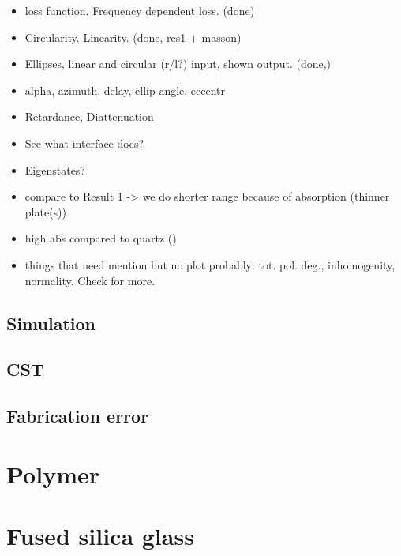 \begin{itemize}
    \item loss function. Frequency dependent loss. (done)
    \item Circularity. Linearity. (done, res1 + masson)
    \item Ellipses, linear and circular (r/l?) input, shown output. (done,)
    \item alpha, azimuth, delay, ellip angle, eccentr
    \item Retardance, Diattenuation
    \item See what interface does?
    \item Eigenstates?
    \item compare to Result 1 -> we do shorter range because of absorption (thinner plate(s))
    \item high abs compared to quartz (\cite{DGrischkowsky1990})
    \item things that need mention but no plot probably: tot. pol. deg., inhomogenity, normality. Check for more.
\end{itemize}

\subsection{Simulation}
\subsection{CST}
\subsection{Fabrication error}

\section{Polymer}

\section{Fused silica glass}



